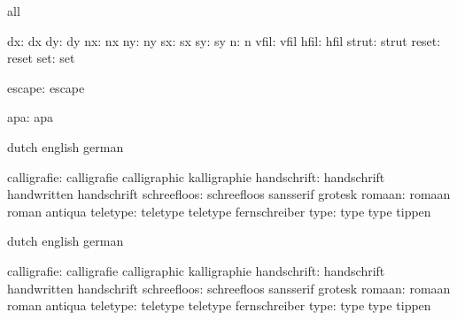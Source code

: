 \stopvariables




\startconstants       all

                 dx:  dx
                 dy:  dy
                 nx:  nx
                 ny:  ny
                 sx:  sx
                 sy:  sy
                  n:  n
               vfil:  vfil
               hfil:  hfil
              strut:  strut
              reset:  reset
                set:  set

             escape:  escape

                apa:  apa

\stopconstants




\startconstants       dutch                english             german

        calligrafie:  calligrafie          calligraphic        kalligraphie
        handschrift:  handschrift          handwritten         handschrift
        schreefloos:  schreefloos          sansserif           grotesk
             romaan:  romaan               roman               antiqua
           teletype:  teletype             teletype            fernschreiber
               type:  type                 type                tippen

\stopconstants

\startvariables       dutch                english             german

        calligrafie:  calligrafie          calligraphic        kalligraphie
        handschrift:  handschrift          handwritten         handschrift
        schreefloos:  schreefloos          sansserif           grotesk
             romaan:  romaan               roman               antiqua
           teletype:  teletype             teletype            fernschreiber
               type:  type                 type                tippen

\stopvariables



